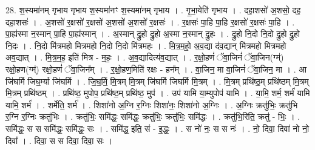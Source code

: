 \documentclass[17pt]{extarticle}
\begin{document}
28. श॒स्यमा॑नम् गृभाय गृभाय श॒स्यमा॑नꣳ श॒स्यमा॑नम् गृभाय । . गृ॒भा॒येति॑ गृभाय । . दहा॒शसो॑ अ॒शसो॒ दह॒ दहा॒शसः॑ । . अ॒शसो॑ र॒क्षसो॑ र॒क्षसो॑ अ॒शसो॑ अ॒शसो॑ र॒क्षसः॑ । . र॒क्षसः॑ पा॒हि पा॒हि र॒क्षसो॑ र॒क्षसः॑ पा॒हि । . पा॒ह्य॑स्मा न॒स्मान् पा॒हि पा॒ह्य॑स्मान् । . अ॒स्मान् द्रु॒हो द्रु॒हो अ॒स्मा न॒स्मान् द्रु॒हः । . द्रु॒हो नि॒दो नि॒दो द्रु॒हो द्रु॒हो नि॒दः । . नि॒दो मि॑त्रमहो मित्रमहो नि॒दो नि॒दो मि॑त्रमहः । . मि॒त्र॒म॒हो॒ अ॒व॒द्या द॑व॒द्यान् मि॑त्रमहो मित्रमहो अव॒द्यात् । . मि॒त्र॒म॒ह॒ इति॑ मित्र - म॒हः॒ । . अ॒व॒द्यादित्य॑व॒द्यात् । . र॒क्षो॒हणं॑ ॅवा॒जिनं॑ ॅवा॒जिन(ग्म्॑) रक्षो॒हण(ग्म्॑) रक्षो॒हणं॑ ॅवा॒जिन᳚म् । . र॒क्षो॒हण॒मिति॑ रक्षः - हन᳚म् । . वा॒जिन॒ मा वा॒जिनं॑ ॅवा॒जिन॒ मा । . आ जि॑घर्मि जिघ॒र्म्या जि॑घर्मि । . जि॒घ॒र्मि॒ मि॒त्रम् मि॒त्रम् जि॑घर्मि जिघर्मि मि॒त्रम् । . मि॒त्रम् प्रथि॑ष्ठ॒म् प्रथि॑ष्ठम् मि॒त्रम् मि॒त्रम् प्रथि॑ष्ठम् । . प्रथि॑ष्ठ॒ मुपोप॒ प्रथि॑ष्ठ॒म् प्रथि॑ष्ठ॒ मुप॑ । . उप॑ यामि या॒म्युपोप॑ यामि । . या॒मि॒ शर्म॒ शर्म॑ यामि यामि॒ शर्म॑ । . शर्मेति॒ शर्म॑ । . शिशा॑नो अ॒ग्नि र॒ग्निः शिशा॑नः॒ शिशा॑नो अ॒ग्निः । . अ॒ग्निः क्रतु॑भिः॒ क्रतु॑भि र॒ग्नि र॒ग्निः क्रतु॑भिः । . क्रतु॑भिः॒ समि॑द्धः॒ समि॑द्धः॒ क्रतु॑भिः॒ क्रतु॑भिः॒ समि॑द्धः । . क्रतु॑भि॒रिति॒ क्रतु॑ - भिः॒ । . समि॑द्धः॒ स स समि॑द्धः॒ समि॑द्धः॒ सः । . समि॑द्ध॒ इति॒ सं - इ॒द्धः॒ । . स नो॑ नः॒ स स नः॑ । . नो॒ दिवा॒ दिवा॑ नो नो॒ दिवा᳚ । . दिवा॒ स स दिवा॒ दिवा॒ सः । \newline
\end{document}
